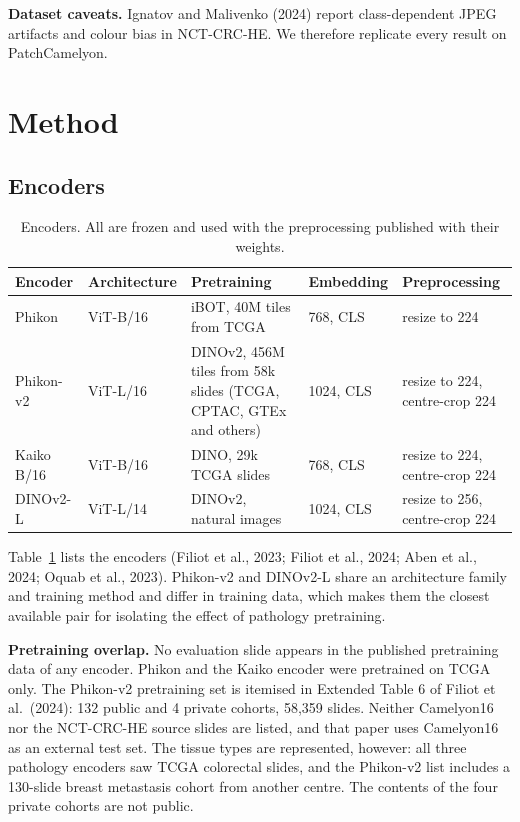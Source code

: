 \documentclass[11pt,a4paper]{article}
\begin{document}
\textbf{Dataset caveats.} Ignatov and Malivenko (2024) report class-dependent JPEG artifacts and colour bias in NCT-CRC-HE. We therefore replicate every result on PatchCamelyon.

\section{Method}

\subsection{Encoders}

\begin{table}[h]\centering\small
\caption{Encoders. All are frozen and used with the preprocessing published with their weights.}
\label{tab:encoders}
\begin{tabular}{@{}l l p{4.6cm} l p{3.1cm}@{}}
\toprule
Encoder & Architecture & Pretraining & Embedding & Preprocessing\\
\midrule
Phikon & ViT-B/16 & iBOT, 40M tiles from TCGA & 768, CLS & resize to 224\\
Phikon-v2 & ViT-L/16 & DINOv2, 456M tiles from 58k slides (TCGA, CPTAC, GTEx and others) & 1024, CLS & resize to 224, centre-crop 224\\
Kaiko B/16 & ViT-B/16 & DINO, 29k TCGA slides & 768, CLS & resize to 224, centre-crop 224\\
DINOv2-L & ViT-L/14 & DINOv2, natural images & 1024, CLS & resize to 256, centre-crop 224\\
\bottomrule
\end{tabular}
\end{table}

Table~\ref{tab:encoders} lists the encoders (Filiot et al., 2023; Filiot et al., 2024; Aben et al., 2024; Oquab et al., 2023). Phikon-v2 and DINOv2-L share an architecture family and training method and differ in training data, which makes them the closest available pair for isolating the effect of pathology pretraining.

\textbf{Pretraining overlap.} No evaluation slide appears in the published pretraining data of any encoder. Phikon and the Kaiko encoder were pretrained on TCGA only. The Phikon-v2 pretraining set is itemised in Extended Table 6 of Filiot et al.\ (2024): 132 public and 4 private cohorts, 58,359 slides. Neither Camelyon16 nor the NCT-CRC-HE source slides are listed, and that paper uses Camelyon16 as an external test set. The tissue types are represented, however: all three pathology encoders saw TCGA colorectal slides, and the Phikon-v2 list includes a 130-slide breast metastasis cohort from another centre. The contents of the four private cohorts are not public.
\end{document}
